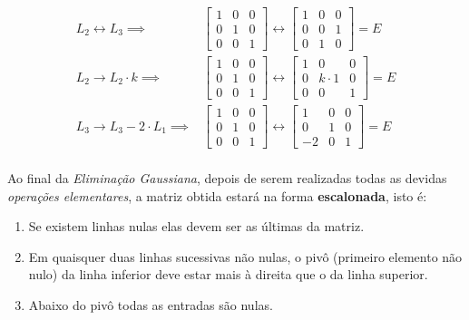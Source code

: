 \documentclass[12pt]{article}
\begin{document}
	\begin{align}
		L_2\leftrightarrow L_3 \implies &
		\begin{bmatrix}
			1 & 0 &0\\
			0 & 1 & 0\\
			0 & 0 & 1
		\end{bmatrix} \leftrightarrow 
		\begin{bmatrix}
			1 & 0 &0\\
			0 & 0 & 1\\
			0 & 1 & 0
		\end{bmatrix}=E\\
		L_2\rightarrow L_2 \cdot k\implies &
		\begin{bmatrix}
			1 & 0 &0\\
			0 & 1 & 0\\
			0 & 0 & 1
		\end{bmatrix} \leftrightarrow 
		\begin{bmatrix}
			1 & 0 &0\\
			0 & k\cdot 1 & 0\\
			0 & 0 & 1
		\end{bmatrix}=E\\
		L_3 \rightarrow L_3-2\cdot L_1 \implies &
		\begin{bmatrix}
			1 & 0 &0\\
			0 & 1 & 0\\
			0 & 0 & 1
		\end{bmatrix} \leftrightarrow 
		\begin{bmatrix}
			1 & 0 &0\\
			0 & 1 & 0\\
			-2 & 0 & 1
		\end{bmatrix}=E
	\end{align}\\
	
	Ao final da \textit{Eliminação Gaussiana}, depois de serem realizadas todas as devidas \textit{operações elementares}, a matriz obtida estará na forma \textbf{escalonada}, isto é:
	\begin{enumerate}
		\item Se existem linhas nulas elas devem ser as últimas da matriz.
		\item Em quaisquer duas linhas sucessivas não nulas, o pivô (primeiro elemento não nulo) da linha inferior deve estar mais à direita que o da linha superior.
		\item Abaixo do pivô todas as entradas são nulas.
	\end{enumerate}
	
\end{document}

